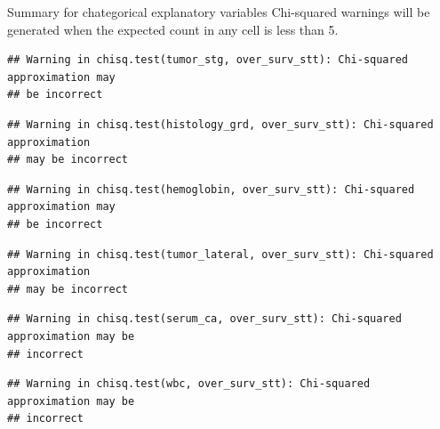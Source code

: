\documentclass[]{article}
\newenvironment{Shaded}{\begin{snugshade}}{\end{snugshade}}
\newcommand{\KeywordTok}[1]{\textcolor[rgb]{0.13,0.29,0.53}{\textbf{#1}}}
\newcommand{\DataTypeTok}[1]{\textcolor[rgb]{0.13,0.29,0.53}{#1}}
\newcommand{\StringTok}[1]{\textcolor[rgb]{0.31,0.60,0.02}{#1}}
\newcommand{\CommentTok}[1]{\textcolor[rgb]{0.56,0.35,0.01}{\textit{#1}}}
\newcommand{\OtherTok}[1]{\textcolor[rgb]{0.56,0.35,0.01}{#1}}
\newcommand{\OperatorTok}[1]{\textcolor[rgb]{0.81,0.36,0.00}{\textbf{#1}}}
\newcommand{\NormalTok}[1]{#1}
\begin{document}
Summary for chategorical explanatory variables Chi-squared warnings will
be generated when the expected count in any cell is less than 5.

\begin{Shaded}
\end{Shaded}

\begin{verbatim}
## Warning in chisq.test(tumor_stg, over_surv_stt): Chi-squared approximation may
## be incorrect
\end{verbatim}

\begin{verbatim}
## Warning in chisq.test(histology_grd, over_surv_stt): Chi-squared approximation
## may be incorrect
\end{verbatim}

\begin{verbatim}
## Warning in chisq.test(hemoglobin, over_surv_stt): Chi-squared approximation may
## be incorrect
\end{verbatim}

\begin{verbatim}
## Warning in chisq.test(tumor_lateral, over_surv_stt): Chi-squared approximation
## may be incorrect
\end{verbatim}

\begin{verbatim}
## Warning in chisq.test(serum_ca, over_surv_stt): Chi-squared approximation may be
## incorrect
\end{verbatim}

\begin{verbatim}
## Warning in chisq.test(wbc, over_surv_stt): Chi-squared approximation may be
## incorrect
\end{verbatim}
\end{document}
